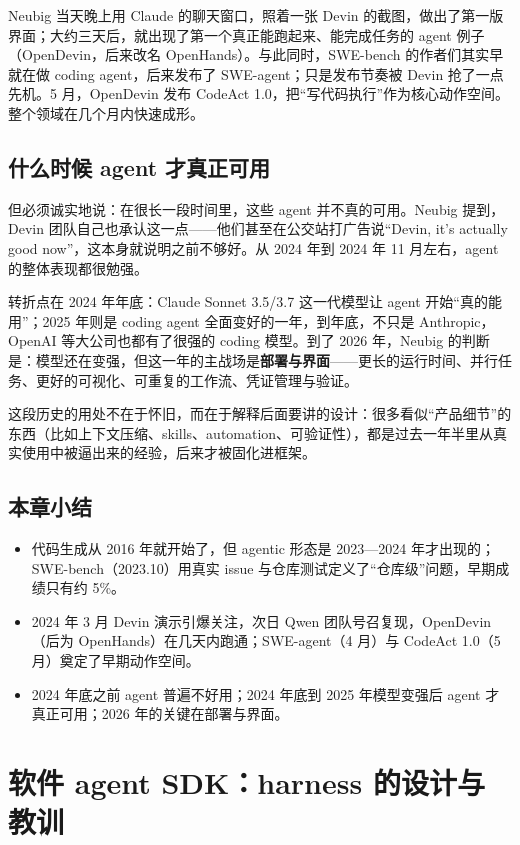 \documentclass[a4paper]{article}
\begin{document}
Neubig 当天晚上用 Claude 的聊天窗口，照着一张 Devin 的截图，做出了第一版界面；大约三天后，就出现了第一个真正能跑起来、能完成任务的 agent 例子（OpenDevin，后来改名 OpenHands）。与此同时，SWE-bench 的作者们其实早就在做 coding agent，后来发布了 SWE-agent；只是发布节奏被 Devin 抢了一点先机。5 月，OpenDevin 发布 CodeAct 1.0，把“写代码执行”作为核心动作空间。整个领域在几个月内快速成形。

\subsection{什么时候 agent 才真正可用}

但必须诚实地说：在很长一段时间里，这些 agent 并不真的可用。Neubig 提到，Devin 团队自己也承认这一点——他们甚至在公交站打广告说“Devin, it's actually good now”，这本身就说明之前不够好。从 2024 年到 2024 年 11 月左右，agent 的整体表现都很勉强。

转折点在 2024 年年底：Claude Sonnet 3.5/3.7 这一代模型让 agent 开始“真的能用”；2025 年则是 coding agent 全面变好的一年，到年底，不只是 Anthropic，OpenAI 等大公司也都有了很强的 coding 模型。到了 2026 年，Neubig 的判断是：模型还在变强，但这一年的主战场是\textbf{部署与界面}——更长的运行时间、并行任务、更好的可视化、可重复的工作流、凭证管理与验证。

这段历史的用处不在于怀旧，而在于解释后面要讲的设计：很多看似“产品细节”的东西（比如上下文压缩、skills、automation、可验证性），都是过去一年半里从真实使用中被逼出来的经验，后来才被固化进框架。

\subsection{本章小结}

\begin{itemize}
\item 代码生成从 2016 年就开始了，但 agentic 形态是 2023—2024 年才出现的；SWE-bench（2023.10）用真实 issue 与仓库测试定义了“仓库级”问题，早期成绩只有约 5\%。
\item 2024 年 3 月 Devin 演示引爆关注，次日 Qwen 团队号召复现，OpenDevin（后为 OpenHands）在几天内跑通；SWE-agent（4 月）与 CodeAct 1.0（5 月）奠定了早期动作空间。
\item 2024 年底之前 agent 普遍不好用；2024 年底到 2025 年模型变强后 agent 才真正可用；2026 年的关键在部署与界面。
\end{itemize}

\section{软件 agent SDK：harness 的设计与教训}
\end{document}
